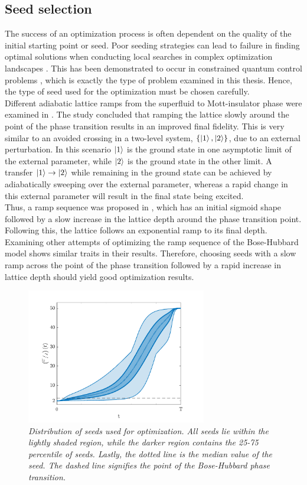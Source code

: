 \subsection{Seed selection}
The success of an optimization process is often dependent on the quality of the initial starting point or seed. Poor seeding strategies can lead to failure in finding optimal solutions when conducting local searches in complex optimization landscapes \cite{Sorensen2016}. This has been demonstrated to occur in constrained quantum control problems \cite{Zhdanov2015}, which is exactly the type of problem examined in this thesis. Hence, the type of seed used for the optimization must be chosen carefully.\\ 
Different adiabatic lattice ramps from the superfluid to Mott-insulator phase were examined in \cite{Zakrzewski2009}. The study concluded that ramping the lattice slowly around the point of the phase transition results in an improved final fidelity. This is very similar to an avoided crossing in a two-level system, $\{ \ket{1} , \ket{2} \}$, due to an external perturbation. In this scenario $\ket{1}$ is the ground state in one asymptotic limit of the external parameter, while $\ket{2}$ is the ground state in the other limit. A transfer $\ket{1} \to \ket{2}$ while remaining in the ground state can be achieved by adiabatically sweeping over the external parameter, whereas a rapid change in this external parameter will result in the final state being excited.\\
Thus, a ramp sequence was proposed in \cite{Zakrzewski2009}, which has an initial sigmoid shape followed by a slow increase in the lattice depth around the phase transition point. Following this, the lattice follows an exponential ramp to its final depth. Examining other attempts of optimizing the ramp sequence of the Bose-Hubbard model \cite{Doria2011,FrankBloch} shows similar traits in their results. Therefore, choosing seeds with a slow ramp across the point of the phase transition followed by a rapid increase in lattice depth should yield good optimization results.
\begin{figure}[h!]
    \centering
    \includegraphics[width=0.7\textwidth]{Figures/LinSigSeed.pdf}
    \caption{\textit{Distribution of seeds used for optimization. All seeds lie within the lightly shaded region, while the darker region contains the 25-75 percentile of seeds. Lastly, the dotted line is the median value of the seed. The dashed line signifies the point of the Bose-Hubbard phase transition.}}
    \label{fig:LinSigSeed}
\end{figure}
